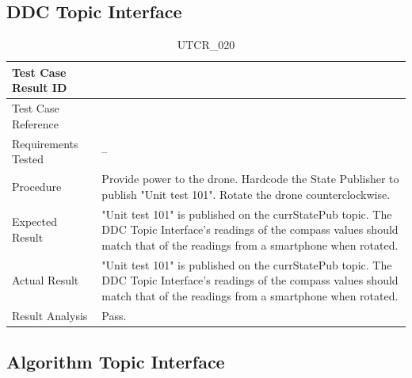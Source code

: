 \documentclass[12pt, titlepage]{article}
\begin{document}
\clearpage

\subsection{DDC Topic Interface}
\label{subsec:ddcTopicInterface}

\begin{table}[!h]
\begin{center}
\caption {UTCR\_020}
\label{tab:UTCR_020}
\begin{tabular}{ | m{3.2cm} | m{12.2cm} | } 
\hline
Test Case Result ID & \nameref{tab:UTCR_020} \\ 
\hline
Test Case Reference & \nameref{tab:UTC_020}  \\ 
\hline
Requirements Tested & -- \\ 
\hline
Procedure & Provide power to the drone. Hardcode the State Publisher to publish "Unit test 101". Rotate the drone counterclockwise. \\ 
\hline
Expected Result & "Unit test 101" is published on the currStatePub topic. The DDC Topic Interface's readings of the compass values should match that of the readings from a smartphone when rotated. \\
\hline
Actual Result & "Unit test 101" is published on the currStatePub topic. The DDC Topic Interface's readings of the compass values should match that of the readings from a smartphone when rotated. \\
\hline
Result Analysis & Pass. \\ 
\hline
\end{tabular}
\end{center}
\end{table}

\clearpage

\subsection{Algorithm Topic Interface}
\label{subsec:algoTopicInterface}
\end{document}
